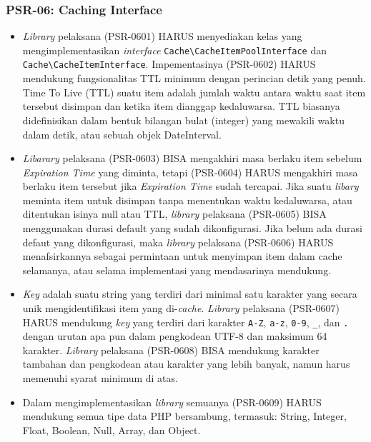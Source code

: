 \subsubsection{PSR-06: Caching Interface}
\label{subsubsec:psr06}
\begin{itemize}
	\item \textit{Library} pelaksana (PSR-0601) HARUS menyediakan kelas yang mengimplementasikan \textit{interface} \verb|Cache\CacheItemPoolInterface| dan \verb|Cache\CacheItemInterface|. Impementasinya (PSR-0602) HARUS mendukung fungsionalitas TTL minimum dengan perincian detik yang penuh. Time To Live (TTL) suatu item adalah jumlah waktu antara waktu saat item tersebut disimpan dan ketika item dianggap kedaluwarsa. TTL biasanya didefinisikan dalam bentuk bilangan bulat (integer) yang mewakili waktu dalam detik, atau sebuah objek DateInterval.
	\item \textit{Libarary} pelaksana (PSR-0603) BISA mengakhiri masa berlaku item sebelum \textit{Expiration Time} yang diminta, tetapi (PSR-0604) HARUS mengakhiri masa berlaku item tersebut jika \textit{Expiration Time} sudah tercapai. Jika suatu \textit{libary} meminta item untuk disimpan tanpa menentukan waktu kedaluwarsa, atau ditentukan isinya null atau TTL,  \textit{library} pelaksana (PSR-0605) BISA menggunakan durasi default yang sudah dikonfigurasi. Jika belum ada durasi defaut yang dikonfigurasi, maka \textit{library} pelaksana (PSR-0606) HARUS menafsirkannya sebagai permintaan untuk menyimpan item dalam cache selamanya, atau selama implementasi yang mendasarinya mendukung.
	\item \textit{Key} adalah suatu string yang terdiri dari minimal satu karakter yang secara unik mengidentifikasi item yang di-\textit{cache}. \textit{Library} pelaksana (PSR-0607) HARUS mendukung \textit{key} yang terdiri dari karakter \verb|A-Z|, \verb|a-z|, \verb|0-9|, \verb|_|, dan \verb|.| dengan urutan apa pun dalam pengkodean UTF-8 dan maksimum 64 karakter. \textit{Library} pelaksana (PSR-0608) BISA mendukung karakter tambahan dan pengkodean atau karakter yang lebih banyak, namun harus memenuhi syarat minimum di atas.
	\item Dalam mengimplementasikan \textit{library} semuanya (PSR-0609) HARUS mendukung semua tipe data PHP bersambung, termasuk: String, Integer, Float, Boolean, Null, Array, dan Object.
\end{itemize}

